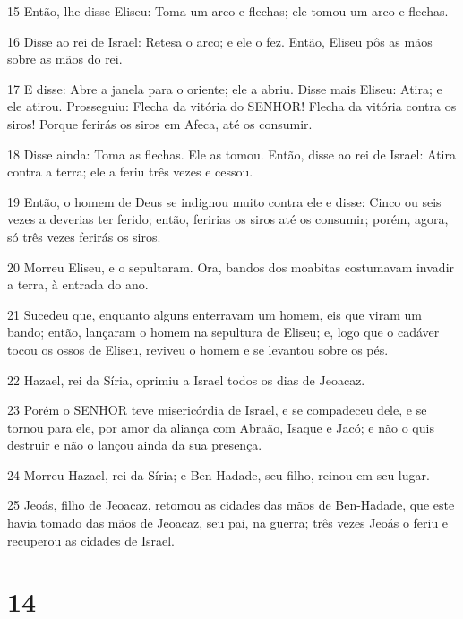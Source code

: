 \par 15 Então, lhe disse Eliseu: Toma um arco e flechas; ele tomou um arco e flechas.
\par 16 Disse ao rei de Israel: Retesa o arco; e ele o fez. Então, Eliseu pôs as mãos sobre as mãos do rei.
\par 17 E disse: Abre a janela para o oriente; ele a abriu. Disse mais Eliseu: Atira; e ele atirou. Prosseguiu: Flecha da vitória do SENHOR! Flecha da vitória contra os siros! Porque ferirás os siros em Afeca, até os consumir.
\par 18 Disse ainda: Toma as flechas. Ele as tomou. Então, disse ao rei de Israel: Atira contra a terra; ele a feriu três vezes e cessou.
\par 19 Então, o homem de Deus se indignou muito contra ele e disse: Cinco ou seis vezes a deverias ter ferido; então, feririas os siros até os consumir; porém, agora, só três vezes ferirás os siros.
\par 20 Morreu Eliseu, e o sepultaram. Ora, bandos dos moabitas costumavam invadir a terra, à entrada do ano.
\par 21 Sucedeu que, enquanto alguns enterravam um homem, eis que viram um bando; então, lançaram o homem na sepultura de Eliseu; e, logo que o cadáver tocou os ossos de Eliseu, reviveu o homem e se levantou sobre os pés.
\par 22 Hazael, rei da Síria, oprimiu a Israel todos os dias de Jeoacaz.
\par 23 Porém o SENHOR teve misericórdia de Israel, e se compadeceu dele, e se tornou para ele, por amor da aliança com Abraão, Isaque e Jacó; e não o quis destruir e não o lançou ainda da sua presença.
\par 24 Morreu Hazael, rei da Síria; e Ben-Hadade, seu filho, reinou em seu lugar.
\par 25 Jeoás, filho de Jeoacaz, retomou as cidades das mãos de Ben-Hadade, que este havia tomado das mãos de Jeoacaz, seu pai, na guerra; três vezes Jeoás o feriu e recuperou as cidades de Israel.

\chapter{14}

